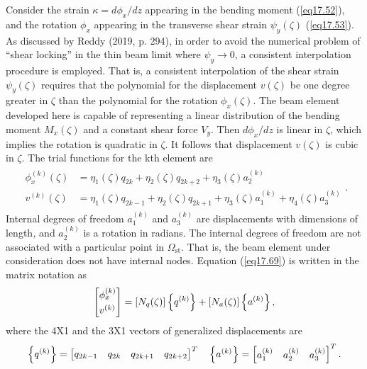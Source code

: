 \documentclass{AeroStructure-ERJohnson}
\begin{document}
Consider the strain $\kappa=d \phi_{x}/d z$ appearing in the bending moment (\ref{eq17.52}), and the rotation $\phi_{x}$ appearing in the transverse shear strain $\psi_{y}(\zeta)$ (\ref{eq17.53}). As discussed by Reddy (2019, p. 294), in order to avoid the numerical problem of ``shear locking'' in the thin beam limit where $\psi_{y} \rightarrow 0$, a consistent interpolation procedure is employed. That is, a consistent interpolation of the shear strain $\psi_{y}(\zeta)$ requires that the polynomial for the displacement $v(\zeta)$ be one degree greater in $\zeta$ than the polynomial for the rotation $\phi_{x}(\zeta)$. The beam element developed here is capable of representing a linear distribution of the bending moment $M_{x}(\zeta)$ and a constant shear force $V_{y}$. Then $d \phi_{x}/d z$ is linear in $\zeta$, which implies the rotation is quadratic in $\zeta$. It follows that displacement $v(\zeta)$ is cubic in $\zeta$. The trial functions for the kth element are
\begin{align}\label{eq17.69}
\begin{split}\phi_{x}^{(k)}(\zeta)&=\eta_{1}(\zeta) q_{2 k}+\eta_{2}(\zeta) q_{2 k+2}+\eta_{3}(\zeta) a_{2}^{(k)} \\
v^{(k)}(\zeta)&=\eta_{1}(\zeta) q_{2 k-1}+\eta_{2}(\zeta) q_{2 k+1}+\eta_{3}(\zeta) a_{1}^{(k)}+\eta_{4}(\zeta) a_{3}^{(k)}
\end{split}.
\end{align}
Internal degrees of freedom $a_{1}^{(k)}$ and $a_{3}^{(k)}$ are displacements with dimensions of length\textit{, }and $a_{2}^{(k)}$ is a rotation in radians. The internal degrees of freedom are not associated with a particular point in $\Omega_{\mathrm{st}}$. That is, the\vadjust{\pagebreak} beam element under consideration does not have internal nodes. Equation (\ref{eq17.69}) is written in the matrix notation as
\begin{align}\label{eq17.70}
\left[\begin{array}{@{}l@{}}\phi_{x}^{(k)} \\[3pt]v^{(k)}\end{array}\right]=\left[N_{q}(\zeta)\right]\left\{q^{(k)}\right\}+\left[N_{a}(\zeta)\right]\left\{a^{(k)}\right\},
\end{align}
where the 4X1 and the 3X1 vectors of generalized displacements are
\begin{align}\label{eq17.71}
\left\{q^{(k)}\right\}=\left[\begin{array}{@{}llll@{}}q_{2 k-1} & q_{2 k} & q_{2 k+1} & q_{2 k+2}\end{array}\right]^{T} \quad\left\{a^{(k)}\right\}=\left[\begin{array}{@{}lll@{}}a_{1}^{(k)} & a_{2}^{(k)} & a_{3}^{(k)}\end{array}\right]^{T}.
\end{align}
\end{document}
